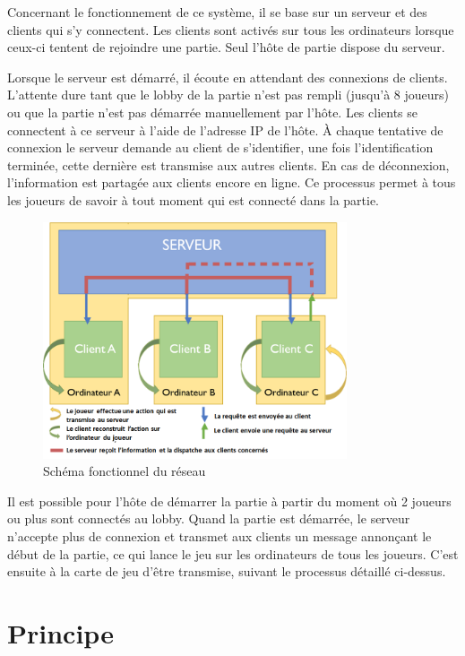 \documentclass[12pt]{report}
\begin{document}
Concernant le fonctionnement de ce système, il se base sur un serveur et des
clients qui s’y connectent. Les clients sont activés sur tous les ordinateurs
lorsque ceux-ci tentent de rejoindre une partie. Seul l’hôte de partie dispose
du serveur.

Lorsque le serveur est démarré, il écoute en attendant des connexions de
clients. L’attente dure tant que le lobby de la partie n’est pas rempli (jusqu’à
8 joueurs) ou que la partie n’est pas démarrée manuellement par l’hôte. Les
clients se connectent à ce serveur à l’aide de l’adresse IP de l’hôte. À chaque
tentative de connexion le serveur demande au client de s’identifier, une fois
l’identification terminée, cette dernière est transmise aux autres clients. En
cas de déconnexion, l’information est partagée aux clients encore en ligne. Ce
processus permet à tous les joueurs de savoir à tout moment qui est connecté
dans la partie.

\begin{figure}[H]
    \centering
    \includegraphics[width=0.8\textwidth]{../report_1/img/multiplayer}
    \caption*{Schéma fonctionnel du réseau}
\end{figure}

\newpage

Il est possible pour l’hôte de démarrer la partie à partir du moment où 2
joueurs ou plus sont connectés au lobby. Quand la partie est démarrée, le
serveur n’accepte plus de connexion et transmet aux clients un message annonçant
le début de la partie, ce qui lance le jeu sur les ordinateurs de tous les
joueurs. C’est ensuite à la carte de jeu d’être transmise, suivant le processus
détaillé ci-dessus.

\section{Principe}
\end{document}
